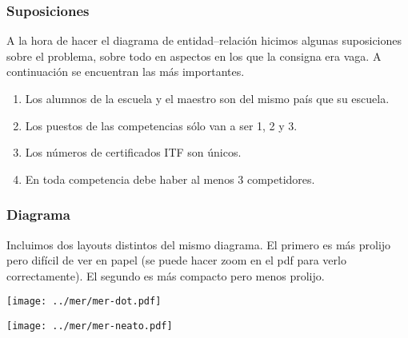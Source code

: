 
\subsubsection{Suposiciones}

A la hora de hacer el diagrama de entidad--relación hicimos algunas suposiciones sobre el problema, sobre todo en aspectos en los que la consigna era vaga. A continuación se encuentran las más importantes.

\begin{enumerate}
	\item Los alumnos de la escuela y el maestro son del mismo país que su escuela.
	\item Los puestos de las competencias sólo van a ser 1, 2 y 3.
	\item Los números de certificados ITF son únicos.
	\item En toda competencia debe haber al menos 3 competidores.
\end{enumerate}

\subsubsection{Diagrama}

Incluimos dos layouts distintos del mismo diagrama. El primero es más prolijo pero difícil de ver en papel (se puede hacer zoom en el pdf para verlo correctamente). El segundo es más compacto pero menos prolijo.

\newpage

\noindent
\texttt{[image: ../mer/mer-dot.pdf]}

\noindent
\texttt{[image: ../mer/mer-neato.pdf]}

